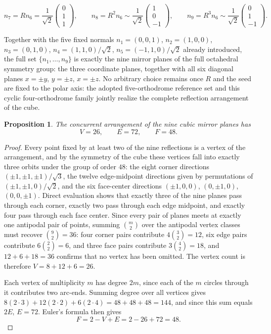 \documentclass[11pt,fleqn]{book}
\numberwithin{equation}{chapter}
\theoremstyle{plain}
\newtheorem{proposition}[theorem]{Proposition}
\theoremstyle{definition}
\theoremstyle{remark}
\begin{document}
\begin{equation}
    n_7=Rn_6=\frac{1}{\sqrt2}\begin{pmatrix}0\\1\\1\end{pmatrix},
    \qquad
    n_8=R^2n_6\sim\frac{1}{\sqrt2}\begin{pmatrix}1\\0\\-1\end{pmatrix},
    \qquad
    n_9=R^3n_6\sim\frac{1}{\sqrt2}\begin{pmatrix}0\\1\\-1\end{pmatrix}.
\end{equation}

Together with the five fixed normals \(n_1=(0,0,1)\), \(n_2=(1,0,0)\), \(n_3=(0,1,0)\), \(n_4=(1,1,0)/\sqrt2\), \(n_5=(-1,1,0)/\sqrt2\) already introduced, the full set \(\{n_1,\dots,n_9\}\) is exactly the nine mirror planes of the full octahedral symmetry group: the three coordinate planes, together with all six diagonal planes \(x=\pm y\), \(y=\pm z\), \(x=\pm z\). No arbitrary choice remains once \(R\) and the seed are fixed to the polar axis: the adopted five-orthodrome reference set and this cyclic four-orthodrome family jointly realize the complete reflection arrangement of the cube.

\begin{proposition}
The concurrent arrangement of the nine cubic mirror planes has
\[
V=26,
\qquad
E=72,
\qquad
F=48.
\]
\end{proposition}

\begin{proof}
Every point fixed by at least two of the nine reflections is a vertex of the arrangement, and by the symmetry of the cube these vertices fall into exactly three orbits under the group of order \(48\): the eight corner directions \((\pm1,\pm1,\pm1)/\sqrt3\), the twelve edge-midpoint directions given by permutations of \((\pm1,\pm1,0)/\sqrt2\), and the six face-center directions \((\pm1,0,0)\), \((0,\pm1,0)\), \((0,0,\pm1)\). Direct evaluation shows that exactly three of the nine planes pass through each corner, exactly two pass through each edge midpoint, and exactly four pass through each face center. Since every pair of planes meets at exactly one antipodal pair of points, summing \(\binom{m}{2}\) over the antipodal vertex classes must recover \(\binom{9}{2}=36\): four corner pairs contribute \(4\binom32=12\), six edge pairs contribute \(6\binom22=6\), and three face pairs contribute \(3\binom42=18\), and \(12+6+18=36\) confirms that no vertex has been omitted. The vertex count is therefore \(V=8+12+6=26\).

Each vertex of multiplicity \(m\) has degree \(2m\), since each of the \(m\) circles through it contributes two arc-ends. Summing degree over all vertices gives \(8(2\cdot3)+12(2\cdot2)+6(2\cdot4)=48+48+48=144\), and since this sum equals \(2E\), \(E=72\). Euler's formula then gives
\[
F=2-V+E=2-26+72=48.
\]
\end{proof}
\end{document}
